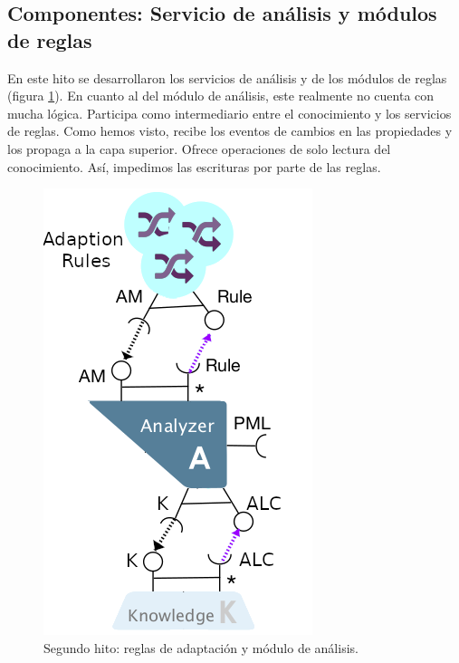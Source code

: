 
\subsection{Componentes: Servicio de análisis y módulos de reglas}

En este hito se desarrollaron los servicios de análisis y de los módulos de reglas (figura \ref{fig:hito-2-analisis}). En cuanto al del módulo de análisis, este realmente no cuenta con mucha lógica. Participa como intermediario entre el conocimiento y los servicios de reglas. Como hemos visto, recibe los eventos de cambios en las propiedades y los propaga a la capa superior. Ofrece operaciones de solo lectura del conocimiento. Así, impedimos las escrituras por parte de las reglas.

\begin{figure}
  \vspace{-20pt}
  \centering
  \includegraphics[scale=0.6]{cap_implementacion/images/hito-2-analisis}
\caption{Segundo hito: reglas de adaptación y módulo de análisis.}
  \label{fig:hito-2-analisis}
  \vspace{-10pt}
\end{figure}

